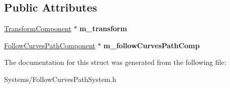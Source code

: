 \subsection*{Public Attributes}
\begin{DoxyCompactItemize}
\item 
\mbox{\label{structFollowCurvesPathCompNode_aa2582478fa67e23ffc5271d98cc1f081}} 
\hyperlink{classTransformComponent}{Transform\+Component} $\ast$ {\bfseries m\+\_\+transform}
\item 
\mbox{\label{structFollowCurvesPathCompNode_a9544f1f91357ff1187b31b62ca04e6e5}} 
\hyperlink{classFollowCurvesPathComponent}{Follow\+Curves\+Path\+Component} $\ast$ {\bfseries m\+\_\+follow\+Curves\+Path\+Comp}
\end{DoxyCompactItemize}


The documentation for this struct was generated from the following file\+:\begin{DoxyCompactItemize}
\item 
Systems/Follow\+Curves\+Path\+System.\+h\end{DoxyCompactItemize}

